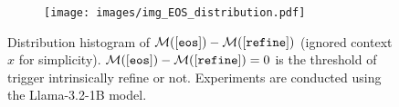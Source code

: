 \begin{figure}[t]
\begin{minipage}{\columnwidth}

    \centering
    \begin{subfigure}[t]{\textwidth}
    \texttt{[image: images/img\_EOS\_distribution.pdf]} 

    \end{subfigure}

    \vspace{-0.1in}
    \caption{Distribution histogram of $\mathcal{M}(\text{$[\mathtt{eos}]$}) - \mathcal{M}(\text{$[\mathtt{refine}]$})$ (ignored context $x$ for simplicity). $\mathcal{M}(\text{$[\mathtt{eos}]$}) - \mathcal{M}(\text{$[\mathtt{refine}]$})=0$ is the threshold of \sname trigger intrinsically refine or not. Experiments are conducted using the Llama-3.2-1B model.}
    \label{figure:verification_distribution}

\end{minipage}
\vspace{-0.15in}
\end{figure}